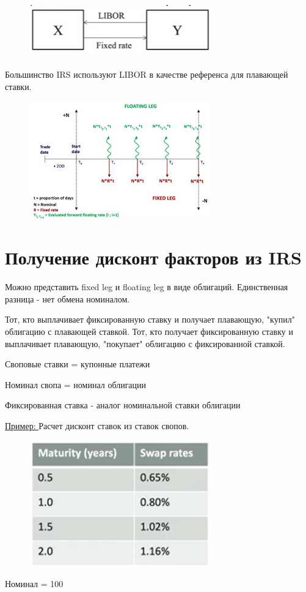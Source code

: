 \documentclass{article}
\begin{document}
\begin{figure}[h]
    \centering
    \includegraphics[width=0.7\textwidth]{9.png}
\end{figure}
Большинство IRS используют LIBOR в качестве референса для плавающей ставки.

\begin{figure}[h]
    \centering
    \includegraphics[width=0.7\textwidth]{10.png}
\end{figure}

\section{Получение дисконт факторов из IRS}

Можно представить fixed leg и floating leg в виде облигаций. Единственная разница - нет обмена номиналом.

Тот, кто выплачивает фиксированную ставку и получает плавающую, "купил" облигацию с плавающей ставкой. Тот, кто получает фиксированную ставку и выплачивает плавающую, "покупает" облигацию с фиксированной ставкой.

\Rightarrow

Своповые ставки = купонные платежи

Номинал свопа = номинал облигации

Фиксированная ставка - аналог номинальной ставки облигации

\underline{Пример: } Расчет дисконт ставок из ставок свопов.
\begin{figure}[h]
    \centering
    \includegraphics[width=0.7\textwidth]{11.png}
\end{figure}
Номинал = 100
\end{document}
